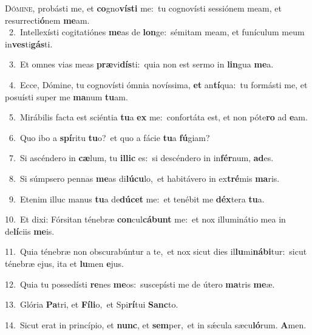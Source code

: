 \lettrine{\initial\textcolor{\initialcolor}{D}}{ómine,} probásti me, et \textbf{co}\-gno\-\textbf{vís}\-\textbf{ti} me:~\star tu cognovísti sessiónem meam, et resurrecti\-\textbf{ó}\-nem \textbf{me}\-am.\\
{\numbfont\textcolor{\numbcolor}{~2.}}~Intellexísti cogitatiónes \textbf{me}\-as de \textbf{lon}\-ge:~\star sémitam meam, et funículum meum in\-\textbf{ves}\-ti\-\textbf{gás}\-ti.\par
{\numbfont\textcolor{\numbcolor}{~3.}}~Et omnes vias meas \textbf{præ}\-vi\-\textbf{dís}\-ti:~\star quia non est sermo in \textbf{lin}\-gua \textbf{me}\-a.\par
{\numbfont\textcolor{\numbcolor}{~4.}}~Ecce, Dómine, tu cognovísti ómnia novíssima, \textbf{et} an\-\textbf{tí}\-qua:~\star tu formásti me, et posuísti super me \textbf{ma}\-num \textbf{tu}\-am.\par
{\numbfont\textcolor{\numbcolor}{~5.}}~Mirábilis facta est sciéntia \textbf{tu}\-a \textbf{ex} me:~\star confortáta est, et non póte\textbf{ro} ad \textbf{e}\-am.\par
{\numbfont\textcolor{\numbcolor}{~6.}}~Quo ibo a \textbf{spí}\-ritu \textbf{tu}\-o?~\star et quo a fácie \textbf{tu}\-a \textbf{fú}\-giam?\par
{\numbfont\textcolor{\numbcolor}{~7.}}~Si ascéndero in \textbf{cæ}\-lum, tu \textbf{il}\-\textbf{lic} es:~\star si descéndero in in\-\textbf{fér}\-num, \textbf{ad}\-es.\par
{\numbfont\textcolor{\numbcolor}{~8.}}~Si súmpsero pennas \textbf{me}\-as di\-\textbf{lú}\-\textbf{cu}lo,~\star et habitávero in ex\-\textbf{tré}\-mis \textbf{ma}\-ris.\par
{\numbfont\textcolor{\numbcolor}{~9.}}~Etenim illuc manus \textbf{tu}\-a de\-\textbf{dú}\-\textbf{cet} me:~\star et tenébit me \textbf{déx}\-tera \textbf{tu}\-a.\par
{\numbfont\textcolor{\numbcolor}{10.}}~Et dixi: Fórsitan ténebræ \textbf{con}\-cul\-\textbf{cá}\-\textbf{bunt} me:~\star et nox illuminátio mea in de\-\textbf{lí}\-ciis \textbf{me}\-is.\par
{\numbfont\textcolor{\numbcolor}{11.}}~Quia ténebræ non obscurabúntur a te,~\dagger et nox sicut dies il\-\textbf{lu}\-mi\-\textbf{ná}\-\textbf{bi}tur:~\star sicut ténebræ ejus, ita et \textbf{lu}\-men \textbf{e}\-jus.\par
{\numbfont\textcolor{\numbcolor}{12.}}~Quia tu possedísti \textbf{re}\-nes \textbf{me}\-os:~\star suscepísti me de útero \textbf{ma}\-tris \textbf{me}\-æ.\par
{\numbfont\textcolor{\numbcolor}{13.}}~Glória \textbf{Pa}\-tri, et \textbf{Fí}\-\textbf{li}o,~\star et Spi\-\textbf{rí}\-tui \textbf{Sanc}\-to.\par
{\numbfont\textcolor{\numbcolor}{14.}}~Sicut erat in princípio, et \textbf{nunc}\-, et \textbf{sem}\-per,~\star et in sǽcula sæcu\-\textbf{ló}\-rum. \textbf{A}\-men.\par
